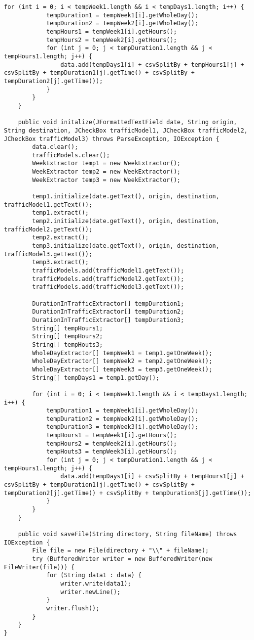 \begin{lstlisting}[caption= DataProcessor.java]
        for (int i = 0; i < tempWeek1.length && i < tempDays1.length; i++) {
            tempDuration1 = tempWeek1[i].getWholeDay();
            tempDuration2 = tempWeek2[i].getWholeDay();
            tempHours1 = tempWeek1[i].getHours();
            tempHours2 = tempWeek2[i].getHours();
            for (int j = 0; j < tempDuration1.length && j < tempHours1.length; j++) {
                data.add(tempDays1[i] + csvSplitBy + tempHours1[j] + csvSplitBy + tempDuration1[j].getTime() + csvSplitBy + tempDuration2[j].getTime());
            }
        }
    }

    public void initalize(JFormattedTextField date, String origin, String destination, JCheckBox trafficModel1, JCheckBox trafficModel2, JCheckBox trafficModel3) throws ParseException, IOException {
        data.clear();
        trafficModels.clear();
        WeekExtractor temp1 = new WeekExtractor();
        WeekExtractor temp2 = new WeekExtractor();
        WeekExtractor temp3 = new WeekExtractor();

        temp1.initialize(date.getText(), origin, destination, trafficModel1.getText());
        temp1.extract();
        temp2.initialize(date.getText(), origin, destination, trafficModel2.getText());
        temp2.extract();
        temp3.initialize(date.getText(), origin, destination, trafficModel3.getText());
        temp3.extract();
        trafficModels.add(trafficModel1.getText());
        trafficModels.add(trafficModel2.getText());
        trafficModels.add(trafficModel3.getText());
        
        DurationInTrafficExtractor[] tempDuration1;
        DurationInTrafficExtractor[] tempDuration2;
        DurationInTrafficExtractor[] tempDuration3;
        String[] tempHours1;
        String[] tempHours2;
        String[] tempHouts3;
        WholeDayExtractor[] tempWeek1 = temp1.getOneWeek();
        WholeDayExtractor[] tempWeek2 = temp2.getOneWeek();
        WholeDayExtractor[] tempWeek3 = temp3.getOneWeek();
        String[] tempDays1 = temp1.getDay();

        for (int i = 0; i < tempWeek1.length && i < tempDays1.length; i++) {
            tempDuration1 = tempWeek1[i].getWholeDay();
            tempDuration2 = tempWeek2[i].getWholeDay();
            tempDuration3 = tempWeek3[i].getWholeDay();
            tempHours1 = tempWeek1[i].getHours();
            tempHours2 = tempWeek2[i].getHours();
            tempHouts3 = tempWeek3[i].getHours();
            for (int j = 0; j < tempDuration1.length && j < tempHours1.length; j++) {
                data.add(tempDays1[i] + csvSplitBy + tempHours1[j] + csvSplitBy + tempDuration1[j].getTime() + csvSplitBy + tempDuration2[j].getTime() + csvSplitBy + tempDuration3[j].getTime());
            }
        }
    }
    
    public void saveFile(String directory, String fileName) throws IOException {
        File file = new File(directory + "\\" + fileName);
        try (BufferedWriter writer = new BufferedWriter(new FileWriter(file))) {
            for (String data1 : data) {
                writer.write(data1);
                writer.newLine();
            }
            writer.flush();
        }
    }
}
\end{lstlisting}